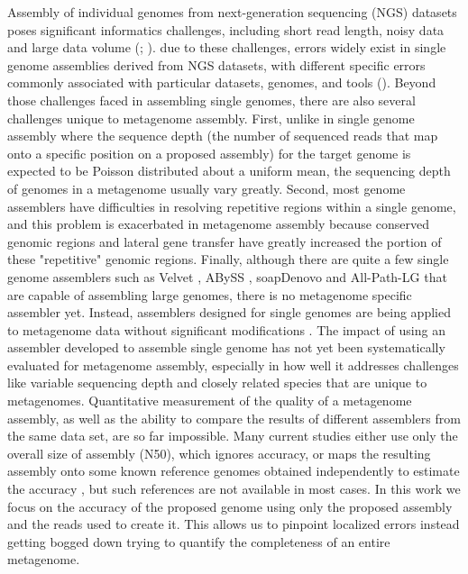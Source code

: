 \documentclass[phd,tocprelim]{cornell}
\begin{document}
Assembly of individual genomes from next-generation sequencing (NGS) datasets poses significant informatics challenges, including short read length, noisy data and large data volume (\cite{Lin2011}; \cite{Pop2009}). due to these challenges, errors widely exist in single genome assemblies derived from NGS datasets, with different specific errors commonly associated with particular datasets, genomes, and tools (\cite{Haiminen2011}). Beyond those challenges faced in assembling single genomes, there are also several challenges unique to metagenome assembly. First, unlike in single genome assembly where the sequence depth (the number of sequenced reads that map onto a specific position on a proposed assembly) for the target genome is expected to be Poisson distributed about a uniform mean, the sequencing depth of genomes in a metagenome usually vary greatly. Second, most genome assemblers have difficulties in resolving repetitive regions within a single genome, and this problem is exacerbated in metagenome assembly because conserved genomic regions and lateral gene transfer have greatly increased the portion of these "repetitive" genomic regions. Finally, although there are quite a few single genome assemblers such as Velvet \cite{Zerbino2008}, ABySS \cite{Simpson2009}, soapDenovo \cite{Li2010} and All-Path-LG \cite{Gnerre2010} that are capable of assembling large genomes, there is no metagenome specific assembler yet. Instead, assemblers designed for single genomes are being applied to metagenome data without significant modifications \cite{Qin2010}\cite{Hess2011}. The impact of using an assembler developed to assemble single genome has not yet been systematically evaluated for metagenome assembly, especially in how well it addresses challenges like variable sequencing depth and closely related species that are unique to metagenomes. Quantitative measurement of the quality of a metagenome assembly, as well as the ability to compare the results of different assemblers from the same data set, are so far impossible. Many current studies either use only the overall size of assembly (N50), which ignores accuracy, or maps the resulting assembly onto some known reference genomes obtained independently to estimate the accuracy \cite{Hess2011}, but such references are not available in most cases. In this work we focus on the accuracy of the proposed genome using only the proposed assembly and the reads used to create it. This allows us to pinpoint localized errors instead getting bogged down trying to quantify the completeness of an entire metagenome.
\end{document}

